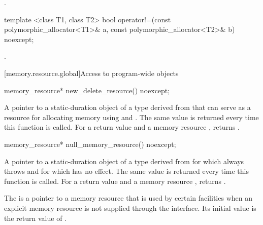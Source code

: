 \begin{itemdescr}
\pnum
\returns
{}.
\end{itemdescr}

%
\begin{itemdecl}
template <class T1, class T2>
  bool operator!=(const polymorphic_allocator<T1>& a,
                  const polymorphic_allocator<T2>& b) noexcept;
\end{itemdecl}

\begin{itemdescr}
\pnum
\returns
{}.
\end{itemdescr}


[memory.resource.global]{Access to program-wide  objects}

%
\begin{itemdecl}
memory_resource* new_delete_resource() noexcept;
\end{itemdecl}

\begin{itemdescr}
\pnum
\returns
A pointer to a static-duration object of a type derived from 
that can serve as a resource for allocating memory
using  and .
The same value is returned every time this function is called.
For a return value  and a memory resource ,
 returns .
\end{itemdescr}

%
\begin{itemdecl}
memory_resource* null_memory_resource() noexcept;
\end{itemdecl}

\begin{itemdescr}
\pnum
\returns
A pointer to a static-duration object of a type derived from 
for which  always throws  and
for which  has no effect.
The same value is returned every time this function is called.
For a return value  and a memory resource ,
 returns .
\end{itemdescr}

\pnum
The  is a pointer to a memory resource
that is used by certain facilities when an explicit memory resource
is not supplied through the interface.
Its initial value is the return value of .

